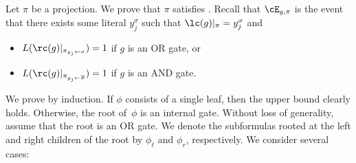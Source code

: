\documentclass{toc}
\begin{document}
Let $\pi$ be a projection. We prove that $\pi$ satisfies .
Recall that $\cE_{g,\pi}$ is the event that there exists some literal
$y_{j}^{\sigma}$ such that $\lc(g)|_{\pi}=y_{j}^{\sigma}$ and
\begin{itemize}
\item $L(\rc(g)|_{\pi_{y_{j}\gets\sigma}})=1$ if $g$ is an OR gate, or 
\item $L(\rc(g)|_{\pi_{y_{j}\gets\overline{\sigma}}})=1$ if $g$ is an
AND gate. 
\end{itemize}
We prove  by induction.
If $\phi$ consists of a single leaf, then the upper bound clearly
holds. Otherwise, the root of~$\phi$ is an internal gate. Without
loss of generality, assume that the root is an OR gate. We denote
the %
subformulas  %
rooted at the left and right children of the root
by $\phi_{\ell}$ and $\phi_{r}$, respectively. We consider several
cases: 
\end{document}
